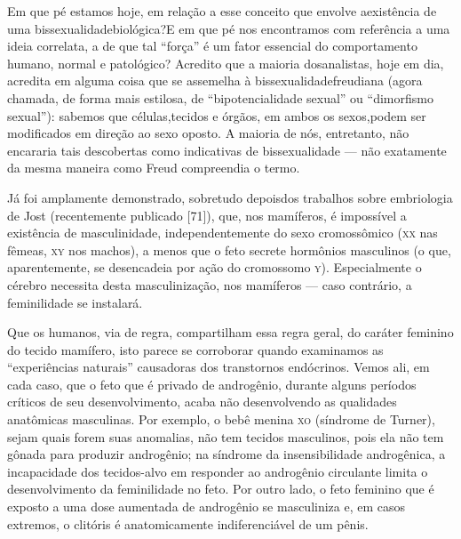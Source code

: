  Em que pé estamos hoje, em relação a esse conceito que envolve a\idxprenat[|(]
existência de uma bissexualidade\idxbisse[|(] biológica?\idxsexopiden[|(] E em que pé nos encontramos
com referência a uma ideia correlata, a de que tal
``força'' é um fator essencial do\idxsexopiden{} comportamento humano, normal e patológico? Acredito que a maioria dos\idxsexod[|(]
analistas, hoje em dia, acredita em alguma coisa que se assemelha à
bissexualidade\idxbissedese[|(] freudiana (agora chamada, de forma mais estilosa, de ``bipotencialidade sexual'' ou
``dimorfismo sexual''): sabemos que células,\idxhormdese[|(]
tecidos e órgãos, em ambos os sexos,\idxidenpre[|(] podem ser modificados em direção
ao sexo oposto. A maioria de nós, entretanto, não encararia tais
descobertas como indicativas de bissexualidade --- não exatamente da
mesma maneira como Freud compreendia o termo.

 Já foi amplamente demonstrado, sobretudo depois\idxcondfsupr[|(] dos trabalhos sobre
embriologia de\idxjost{} Jost (recentemente publicado [71]), que, nos mamíferos,
é impossível a existência de masculinidade, independentemente do sexo
cromossômico (\textsc{xx} nas fêmeas, \textsc{xy} nos machos),
a menos que o feto secrete hormônios masculinos (o que, aparentemente,
se desencadeia por ação do cromossomo \textsc{y}). Especialmente o cérebro necessita
desta masculinização, nos mamíferos --- caso contrário, a feminilidade se instalará.

 Que os humanos, via de regra, compartilham essa regra geral, do caráter
feminino do tecido mamífero, isto parece se corroborar quando
examinamos as \mbox{``experiências} naturais''\idxexpen{} causadoras dos transtornos endócrinos.\idxanimdese{} Vemos ali, em cada caso, que o
feto que é privado de androgênio,\idxandrn{} durante alguns períodos críticos de
seu desenvolvimento, acaba não desenvolvendo as qualidades anatômicas
masculinas. Por exemplo, o bebê menina \textsc{xo} (síndrome de Turner),\idxturner{} sejam
quais forem suas anomalias, não tem tecidos masculinos, pois ela não
tem gônada para produzir androgênio; na síndrome da insensibilidade
androgênica,\idxandrs{} a incapacidade dos tecidos-alvo em responder ao androgênio
circulante limita o desenvolvimento da feminilidade no feto. Por outro
lado, o feto feminino que é exposto a uma dose aumentada de androgênio
se masculiniza e,\idxadren{} em casos extremos, o clitóris\idxclitdese{} é anatomicamente
indiferenciável de um pênis.

